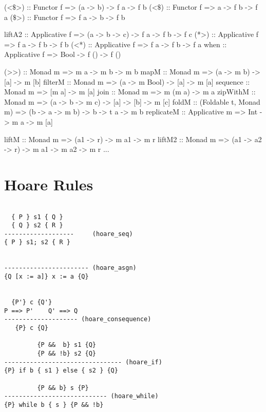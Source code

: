 \documentclass{article}
\begin{document}
\begin{hask}
(<$\$$>) :: Functor f => (a -> b) -> f a -> f b
(<$\$$) :: Functor f => a -> f b -> f a
($\$$>) :: Functor f => f a -> b -> f b

liftA2 :: Applicative f => (a -> b -> c) -> f a -> f b -> f c
(*>) :: Applicative f => f a -> f b -> f b
(<*) :: Applicative f => f a -> f b -> f a
when :: Applicative f => Bool -> f () -> f () 

(>>) :: Monad m => m a -> m b -> m b
mapM :: Monad m => (a -> m b) -> [a] -> m [b] 
filterM :: Monad m => (a -> m Bool) -> [a] -> m [a]
sequence  :: Monad m => [m a] -> m [a]
join :: Monad m => m (m a) -> m a
zipWithM :: Monad m => (a -> b -> m c) -> [a] -> [b] -> m [c] 
foldM :: (Foldable t, Monad m) => (b -> a -> m b) -> b -> t a -> m b 
replicateM :: Applicative m => Int -> m a -> m [a]

liftM :: Monad m => (a1 -> r) -> m a1 -> m r
liftM2 :: Monad m => (a1 -> a2 -> r) -> m a1 -> m a2 -> m r
...
\end{hask}

\pagebreak
\section{Hoare Rules}

\begin{verbatim}

  { P } s1 { Q } 	
  { Q } s2 { R } 
------------------- 	(hoare_seq)  
{ P } s1; s2 { R } 	


----------------------- (hoare_asgn)  
{Q [x := a]} x := a {Q} 	


  {P'} c {Q'} 	
P ==> P'    Q' ==> Q
-------------------- (hoare_consequence)  
   {P} c {Q}

         {P &&  b} s1 {Q} 	
         {P && !b} s2 {Q}
-------------------------------- (hoare_if)  
{P} if b { s1 } else { s2 } {Q}

         {P && b} s {P}
---------------------------- (hoare_while)
{P} while b { s } {P && !b}
\end{verbatim}
\end{document}
